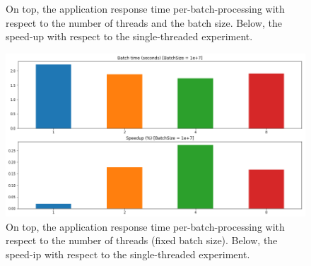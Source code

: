 \documentclass[a4paper, 11pt]{article}
\begin{document}
\begin{appendices}
\begin{figure}
    \caption{On top, the application response time per-batch-processing with respect to the number of threads and the batch size. Below, the speed-up with respect to the single-threaded experiment.}
    \label{fig:perf1}
\end{figure}
\begin{figure}
    \centering
    \includegraphics[width=1\textwidth]{Performance/speedup_analysis_12_1.png}
    \caption{On top, the application response time per-batch-processing with respect to the number of threads (fixed batch size). Below, the speed-ip with respect to the single-threaded experiment.}
    \label{fig:perf2}
\end{figure}
\end{appendices}
\end{document}
